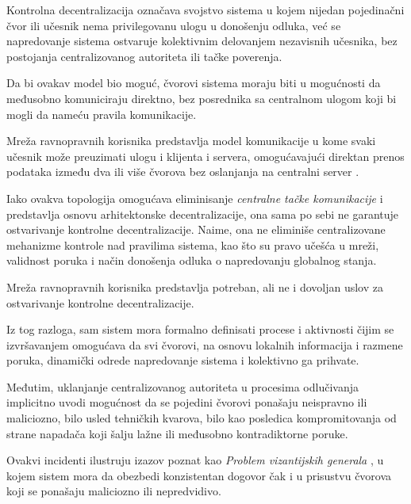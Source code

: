 \begin{definicija}
Kontrolna decentralizacija označava svojstvo sistema u kojem nijedan pojedinačni čvor ili učesnik nema privilegovanu ulogu u donošenju odluka, već se napredovanje sistema ostvaruje kolektivnim delovanjem nezavisnih učesnika, bez postojanja centralizovanog autoriteta ili tačke poverenja.
\end{definicija}

Da bi ovakav model bio moguć, čvorovi sistema moraju biti u mogućnosti da međusobno komuniciraju direktno, bez posrednika sa centralnom ulogom koji bi mogli da nameću pravila komunikacije.

\begin{definicija}
Mreža ravnopravnih korisnika  predstavlja model komunikacije u kome svaki učesnik može preuzimati ulogu i klijenta i servera, omogućavajući direktan prenos podataka između dva ili više čvorova bez oslanjanja na centralni server \cite{oram2001peer}.
\end{definicija}

Iako ovakva topologija omogućava eliminisanje \textit{centralne tačke komunikacije} i predstavlja osnovu arhitektonske decentralizacije, ona sama po sebi ne garantuje ostvarivanje kontrolne decentralizacije. Naime, ona ne eliminiše centralizovane mehanizme kontrole nad pravilima sistema, kao što su pravo učešća u mreži, validnost poruka i način donošenja odluka o napredovanju globalnog stanja.

\begin{teorema}\label{teorema:p2p}
Mreža ravnopravnih korisnika predstavlja potreban, ali ne i dovoljan uslov za ostvarivanje kontrolne decentralizacije.
\end{teorema}

Iz tog razloga, sam sistem mora formalno definisati procese i aktivnosti čijim se izvršavanjem omogućava da svi čvorovi, na osnovu lokalnih informacija i razmene poruka, dinamički odrede napredovanje sistema i kolektivno ga prihvate.

Međutim, uklanjanje centralizovanog autoriteta u procesima odlučivanja implicitno uvodi mogućnost da se pojedini čvorovi ponašaju neispravno ili maliciozno, bilo usled tehničkih kvarova, bilo kao posledica kompromitovanja od strane napadača koji šalju lažne ili međusobno kontradiktorne poruke.

Ovakvi incidenti ilustruju izazov poznat kao \textit{Problem vizantijskih generala} \cite{lamport2019byzantine} , u kojem sistem mora da obezbedi konzistentan dogovor čak i u prisustvu čvorova koji se ponašaju maliciozno ili nepredvidivo. 

